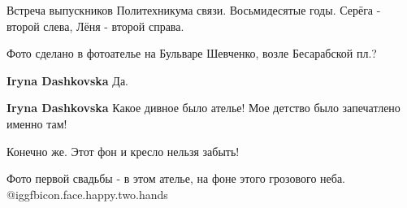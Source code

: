  
 
 
 
 


Встреча выпускников Политехникума связи. Восьмидесятые годы. Серёга - второй
слева, Лёня - второй справа.

Фото сделано в фотоателье на Бульваре Шевченко, возле Бесарабской пл.?

\textbf{Iryna Dashkovska} Да.

\textbf{Iryna Dashkovska} Какое дивное было ателье! Мое детство было запечатлено именно там!

Конечно же. Этот фон и кресло нельзя забыть!

Фото первой свадьбы - в этом ателье, на фоне этого грозового неба. @igg{fbicon.face.happy.two.hands} 
